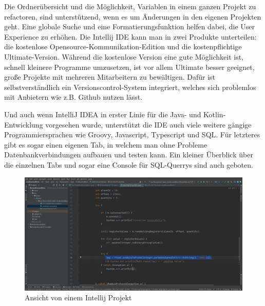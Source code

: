   Die Ordnerübersicht und die Möglichkeit, Variablen in einem ganzen Projekt zu refactoren, sind unterstützend, wenn es um Änderungen in den eigenen Projekten geht. Eine globale Suche und eine Formatierungsfunktion helfen dabei, die User Experience zu erhöhen. Die Intellij IDE kann man in zwei Produkte unterteilen: die kostenlose Opensource-Kommunikation-Edition und die kostenpflichtige Ultimate-Version. Während die kostenlose Version eine gute Möglichkeit ist, schnell kleinere Programme umzusetzen, ist vor allem Ultimate besser geeignet, große Projekte mit mehreren Mitarbeitern zu bewältigen. Dafür ist selbstverständlich ein Versionscontrol-System integriert, welches sich problemlos mit Anbietern wie z.B. Github nutzen lässt.  

Und auch wenn IntelliJ IDEA in erster Linie für die Java- und Kotlin-Entwicklung vorgesehen wurde, unterstützt die IDE auch viele weitere gängige Programmiersprachen wie Groovy, Javascript, Typescript und SQL. Für letzteres gibt es sogar einen eigenen Tab, in welchem man ohne Probleme Datenbankverbindungen aufbauen und testen kann. Ein kleiner Überblick über die einzelnen Tabs und sogar eine Console für SQL-Querrys sind auch geboten.   

\begin{figure}[h t]
  \centering
  \includegraphics[scale=0.2]{pics/IntellijOverfiew.png}
  \caption{Ansicht von einem Intellij Projekt}
  \label{fig:impl:WallboxIntellij}
\end{figure}

 

